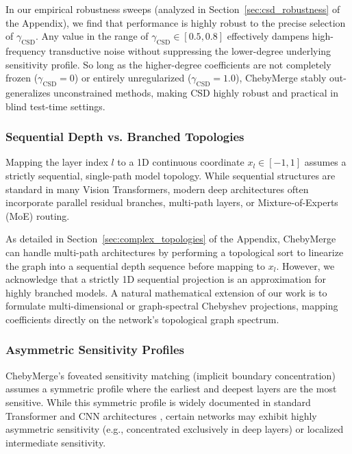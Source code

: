 In our empirical robustness sweeps (analyzed in Section~\ref{sec:csd_robustness} of the Appendix), we find that performance is highly robust to the precise selection of $\gamma_{\text{CSD}}$. Any value in the range of $\gamma_{\text{CSD}} \in [0.5, 0.8]$ effectively dampens high-frequency transductive noise without suppressing the lower-degree underlying sensitivity profile. So long as the higher-degree coefficients are not completely frozen ($\gamma_{\text{CSD}} = 0$) or entirely unregularized ($\gamma_{\text{CSD}} = 1.0$), ChebyMerge stably out-generalizes unconstrained methods, making CSD highly robust and practical in blind test-time settings.

\subsubsection{Sequential Depth vs. Branched Topologies}
Mapping the layer index $l$ to a 1D continuous coordinate $x_l \in [-1, 1]$ assumes a strictly sequential, single-path model topology. While sequential structures are standard in many Vision Transformers, modern deep architectures often incorporate parallel residual branches, multi-path layers, or Mixture-of-Experts (MoE) routing. 

As detailed in Section~\ref{sec:complex_topologies} of the Appendix, ChebyMerge can handle multi-path architectures by performing a topological sort to linearize the graph into a sequential depth sequence before mapping to $x_l$. However, we acknowledge that a strictly 1D sequential projection is an approximation for highly branched models. A natural mathematical extension of our work is to formulate multi-dimensional or graph-spectral Chebyshev projections, mapping coefficients directly on the network's topological graph spectrum.

\subsubsection{Asymmetric Sensitivity Profiles}
ChebyMerge's foveated sensitivity matching (implicit boundary concentration) assumes a symmetric profile where the earliest and deepest layers are the most sensitive. While this symmetric profile is widely documented in standard Transformer and CNN architectures \cite{zhang2019all}, certain networks may exhibit highly asymmetric sensitivity (e.g., concentrated exclusively in deep layers) or localized intermediate sensitivity.

